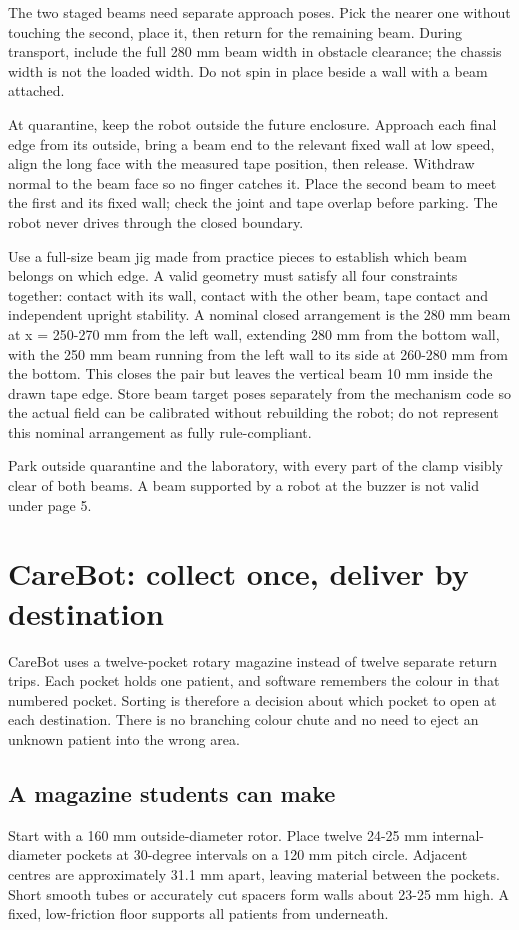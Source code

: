 \documentclass[10pt,a4paper]{article}
\begin{document}
The two staged beams need separate approach poses. Pick the nearer one without touching the second, place it, then return for the remaining beam. During transport, include the full 280 mm beam width in obstacle clearance; the chassis width is not the loaded width. Do not spin in place beside a wall with a beam attached.

At quarantine, keep the robot outside the future enclosure. Approach each final edge from its outside, bring a beam end to the relevant fixed wall at low speed, align the long face with the measured tape position, then release. Withdraw normal to the beam face so no finger catches it. Place the second beam to meet the first and its fixed wall; check the joint and tape overlap before parking. The robot never drives through the closed boundary.

Use a full-size beam jig made from practice pieces to establish which beam belongs on which edge. A valid geometry must satisfy all four constraints together: contact with its wall, contact with the other beam, tape contact and independent upright stability. A nominal closed arrangement is the 280 mm beam at x = 250-270 mm from the left wall, extending 280 mm from the bottom wall, with the 250 mm beam running from the left wall to its side at 260-280 mm from the bottom. This closes the pair but leaves the vertical beam 10 mm inside the drawn tape edge. Store beam target poses separately from the mechanism code so the actual field can be calibrated without rebuilding the robot; do not represent this nominal arrangement as fully rule-compliant.

Park outside quarantine and the laboratory, with every part of the clamp visibly clear of both beams. A beam supported by a robot at the buzzer is not valid under page 5.

\section{CareBot: collect once, deliver by destination}
CareBot uses a twelve-pocket rotary magazine instead of twelve separate return trips. Each pocket holds one patient, and software remembers the colour in that numbered pocket. Sorting is therefore a decision about which pocket to open at each destination. There is no branching colour chute and no need to eject an unknown patient into the wrong area.

\subsection{A magazine students can make}
Start with a 160 mm outside-diameter rotor. Place twelve 24-25 mm internal-diameter pockets at 30-degree intervals on a 120 mm pitch circle. Adjacent centres are approximately 31.1 mm apart, leaving material between the pockets. Short smooth tubes or accurately cut spacers form walls about 23-25 mm high. A fixed, low-friction floor supports all patients from underneath.
\end{document}
